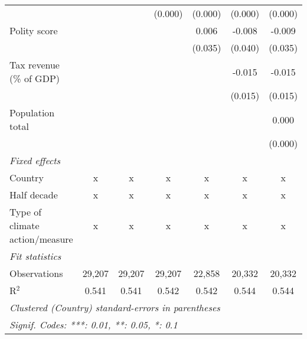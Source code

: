 \begin{tabular}{lcccccc}
                                                                                              &         &         & (0.000)       & (0.000)       & (0.000)       & (0.000)\\   
   Polity score                                                                               &         &         &               & 0.006         & -0.008        & -0.009\\   
                                                                                              &         &         &               & (0.035)       & (0.040)       & (0.035)\\   
   Tax revenue (\% of GDP)                                                                    &         &         &               &               & -0.015        & -0.015\\   
                                                                                              &         &         &               &               & (0.015)       & (0.015)\\   
   Population total                                                                           &         &         &               &               &               & 0.000\\   
                                                                                              &         &         &               &               &               & (0.000)\\   
   \emph{Fixed effects}\\
   Country                                                                                    & x       & x       & x             & x             & x             & x\\  
   Half decade                                                                                & x       & x       & x             & x             & x             & x\\  
   Type of climate action/measure                                                             & x       & x       & x             & x             & x             & x\\  
   \midrule \emph{Fit statistics}\\
   Observations                                                                               & 29,207  & 29,207  & 29,207        & 22,858        & 20,332        & 20,332\\  
   R$^2$                                                                                      & 0.541   & 0.541   & 0.542         & 0.542         & 0.544         & 0.544\\  
   \midrule
   \multicolumn{7}{l}{\emph{Clustered (Country) standard-errors in parentheses}}\\
   \multicolumn{7}{l}{\emph{Signif. Codes: ***: 0.01, **: 0.05, *: 0.1}}\\
\end{tabular}
\par\endgroup


